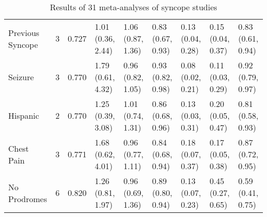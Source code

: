 \begin{table}[ht]
\begin{tabular}{lrrllllll}
  Previous Syncope &    3 & 0.727 & 1.01 (0.36, 2.44) & 1.06 (0.87, 1.36) & 0.83 (0.67, 0.93) & 0.13 (0.04, 0.28) & 0.15 (0.04, 0.37) & 0.83 (0.61, 0.94) \\ 
  Seizure &    3 & 0.770 & 1.79 (0.61, 4.32) & 0.96 (0.82, 1.05) & 0.93 (0.82, 0.98) & 0.08 (0.02, 0.21) & 0.11 (0.03, 0.29) & 0.92 (0.79, 0.97) \\ 
  Hispanic &    2 & 0.770 & 1.25 (0.39, 3.08) & 1.01 (0.74, 1.31) & 0.86 (0.68, 0.96) & 0.13 (0.03, 0.31) & 0.20 (0.05, 0.47) & 0.81 (0.58, 0.93) \\ 
  Chest Pain &    3 & 0.771 & 1.68 (0.62, 4.01) & 0.96 (0.77, 1.11) & 0.84 (0.68, 0.94) & 0.18 (0.07, 0.37) & 0.17 (0.05, 0.38) & 0.87 (0.72, 0.95) \\ 
  No Prodromes &    6 & 0.820 & 1.26 (0.81, 1.97) & 0.96 (0.69, 1.36) & 0.89 (0.80, 0.94) & 0.13 (0.07, 0.23) & 0.45 (0.27, 0.65) & 0.59 (0.41, 0.75) \\ 
   \hline
\end{tabular}
\caption{Results of 31 meta-analyses of syncope studies} 
\end{table}
